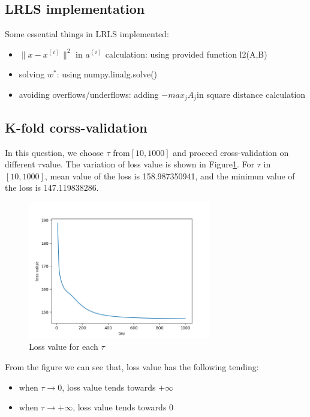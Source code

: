 \documentclass[a4paper]{article}
\begin{document}
\subsection{LRLS implementation}

Some essential things in LRLS implemented:

\begin{itemize}
    \item $\|x-x^{(i)}\|^2$ in $a^{(i)}$ calculation: using provided function l2(A,B)
    \item solving $w^*$: using numpy.linalg.solve()
    \item avoiding overflows/underflows: adding $-max_jA_j$in square distance calculation
\end{itemize}

\subsection{K-fold corss-validation}

In this question, we choose $\tau$ from$[10, 1000]$ and proceed cross-validation on different $\tau$value. The variation of loss value is shown in Figure\ref{fig: Tau_loss}. For $\tau$ in$[10, 1000]$, mean value of the loss is 158.987350941, and the minimun value of the loss is 147.119838286.

\begin{figure}[htbp]
\centering
\includegraphics[width = 8cm]{tau-lossvalue}
\caption{Loss value for each $\tau$}
\label{fig: Tau_loss}
\end{figure}

From the figure we can see that, loss value has the following tending:

\begin{itemize}

    \item when $\tau \to 0$, loss value tends towards $+\infty$
    \item when $\tau \to +\infty$, loss value tends towards $0$
\end{itemize}
\end{document}
